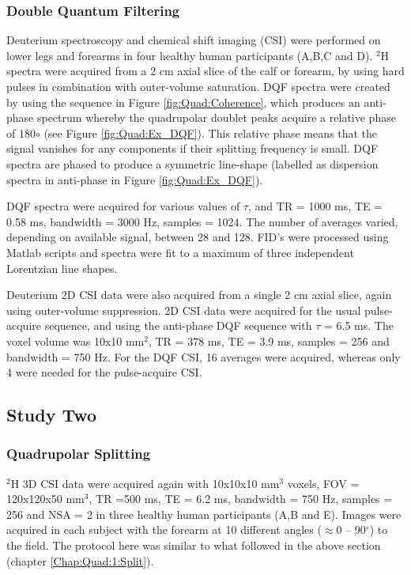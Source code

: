 \documentclass[class=article, crop=false]{standalone}
\begin{document}
\subsubsection{Double Quantum Filtering}
\label{Chap:Quad:1:DQF}

Deuterium spectroscopy and chemical shift imaging (CSI) were performed on lower legs and forearms in four healthy human participants (A,B,C and D). $^2$H spectra were acquired from a 2 cm axial slice of the calf or forearm, by using hard pulses in combination with outer-volume saturation. DQF spectra were created by using the sequence in Figure \ref{fig:Quad:Coherence}, which produces an anti-phase spectrum whereby the quadrupolar doublet peaks acquire a relative phase of 180$\circ$ (see Figure \ref{fig:Quad:Ex_DQF}). This relative phase means that the signal vanishes for any components if their splitting frequency is small. DQF spectra are phased to produce a symmetric line-shape (labelled as dispersion spectra in anti-phase in Figure \ref{fig:Quad:Ex_DQF}).  

DQF spectra were acquired for various values of $\tau$, and TR = 1000 ms, TE = 0.58 ms, bandwidth = 3000 Hz, samples = 1024. The number of averages varied, depending on available signal, between 28 and 128. FID's were processed using Matlab scripts and spectra were fit to a maximum of three independent Lorentzian line shapes.

Deuterium 2D CSI data were also acquired from a single 2 cm axial slice, again using outer-volume suppression. 2D CSI data were acquired for the usual pulse-acquire sequence, and using the anti-phase DQF sequence with $\tau$ = 6.5 ms. The voxel volume was 10x10 mm$^2$, TR = 378 ms, TE = 3.9 ms, samples = 256 and bandwidth = 750 Hz. For the DQF CSI, 16 averages were acquired, whereas only 4 were needed for the pulse-acquire CSI.

\subsection{Study Two}
\subsubsection{Quadrupolar Splitting}

$^2$H 3D CSI data were acquired again with 10x10x10 mm$^3$ voxels, FOV = 120x120x50 mm$^3$, TR =500 ms, TE = 6.2 ms, bandwidth = 750 Hz, samples = 256 and NSA = 2 in three healthy human participants (A,B and E). Images were acquired in each subject with the forearm at 10 different angles ($\approx$0 – 90$^\circ$) to the field. The protocol here was similar to what followed in the above section (chapter \ref{Chap:Quad:1:Split}). 
\end{document}
